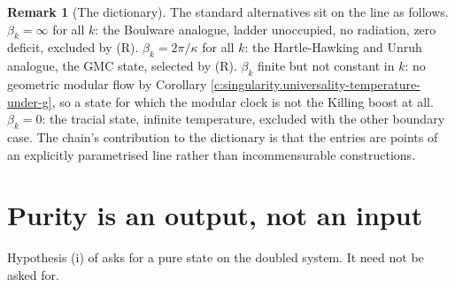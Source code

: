 \documentclass[11pt]{article}
\theoremstyle{definition}
\newtheorem{remark}[theorem]{Remark}
\theoremstyle{plain}
\begin{document}
\begin{remark}[The dictionary]\label{c:note.state-selection.dictionary}
The standard alternatives sit on the line as follows. $\beta_k = \infty$ for all $k$: the Boulware analogue, ladder unoccupied, no radiation, zero deficit, excluded by (R). $\beta_k = 2\pi/\kappa$ for all $k$: the Hartle-Hawking and Unruh analogue, the GMC state, selected by (R). $\beta_k$ finite but not constant in $k$: no geometric modular flow by Corollary \ref{c:singularity.universality-temperature-under-g}, so a state for which the modular clock is not the Killing boost at all. $\beta_k = 0$: the tracial state, infinite temperature, excluded with the other boundary case. The chain's contribution to the dictionary is that the entries are points of an explicitly parametrised line rather than incommensurable constructions.
\end{remark}

\section{Purity is an output, not an input}

\label{c:note.state-selection.setting-purity-output-not-input}
Hypothesis (i) of \cite[Thm.~7.3]{ButlerT5} asks for a pure state on the doubled system. It need not be asked for.
\end{document}
